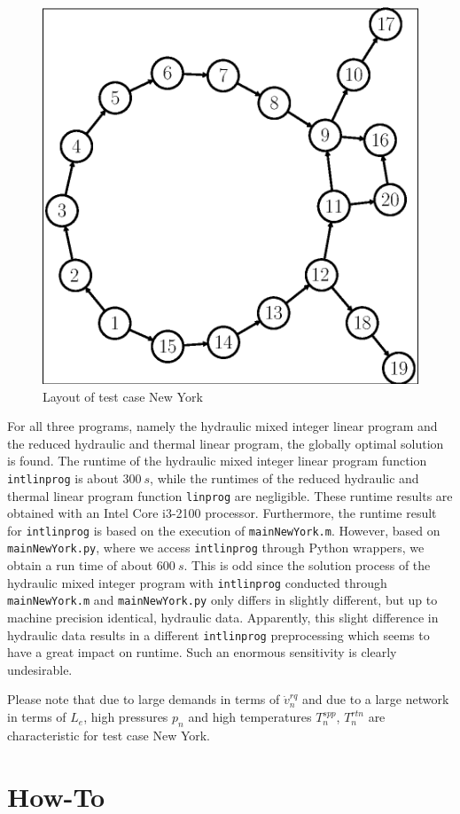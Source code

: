 \documentclass[a4paper,10pt]{article}
\begin{document}
\begin{figure}
  \centering
  \includegraphics[width=.6\textwidth]{Fig/layout}
  \caption{Layout of test case New York}\label{fig:2}
\end{figure}

For all three programs, namely the hydraulic mixed integer linear program and the reduced hydraulic and thermal linear program, the globally optimal solution is found.
The runtime of the hydraulic mixed integer linear program function \texttt{intlinprog} is about $300\ \si{s}$, while the runtimes of the reduced hydraulic and thermal linear program function \texttt{linprog} are negligible.
These runtime results are obtained with an Intel Core i3-2100 processor.
Furthermore, the runtime result for \texttt{intlinprog} is based on the execution of \texttt{mainNewYork.m}.
However, based on \texttt{mainNewYork.py}, where we access \texttt{intlinprog} through Python wrappers, we obtain a run time of about $600\ \si{s}$.
This is odd since the solution process of the hydraulic mixed integer program with \texttt{intlinprog} conducted through \texttt{mainNewYork.m} and \texttt{mainNewYork.py} only differs in slightly different, but up to machine precision identical, hydraulic data.
Apparently, this slight difference in hydraulic data results in a different \texttt{intlinprog} preprocessing which seems to have a great impact on runtime.
Such an enormous sensitivity is clearly undesirable.

Please note that due to large demands in terms of $\dot{v}_n^{rq}$ and due to a large network in terms of $L_e$, high pressures $p_n$ and high temperatures $T_n^{spp}$, $T_n^{rtn}$ are characteristic for test case New York.

\section{How-To}
\end{document}
